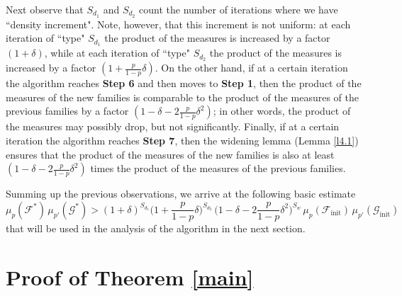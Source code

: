 \documentclass[10pt,a4paper]{amsart}
\theoremstyle{remark}
\newcommand{\Fcal}{\mathcal{F}}
\newcommand{\Gcal}{\mathcal{G}}
\begin{document}
Next observe that $S_{d_1}$ and $S_{d_2}$ count the number of iterations where we have ``density increment"\!.
Note, however, that this increment is not uniform: at each iteration of ``type" $S_{d_1}$
the product of the measures is increased by a factor $(1+\delta)$, while at each iteration of ``type" $S_{d_2}$
the product of the measures is increased by a factor $(1+\frac{p}{1-p}\delta)$. On the other hand, if at a certain
iteration the algorithm reaches \textbf{Step 6} and then moves to \textbf{Step 1}, then the product of the measures
of the new families is comparable to the product of the measures of the previous families by a factor
$(1-\delta-2\frac{p}{1-p}\delta^2)$; in other words, the product of the measures may possibly drop,
but not significantly. Finally,  if at a certain iteration the algorithm reaches \textbf{Step 7},
then the widening lemma (Lemma \ref{l4.1}) ensures that the product of the measures
of the new families is also at least $(1-\delta-2\frac{p}{1-p}\delta^2)$ times
the product of the measures of the previous families.

Summing up the previous observations, we arrive at the following basic estimate
\begin{equation} \label{e5.7}
\mu_p(\Fcal^*)\,\mu_{p'}(\Gcal^*) > (1+\delta)^{S_{d_1}} \Big(1+\frac{p}{1-p}\delta\Big)^{S_{d_2}}\,
\Big(1-\delta-2\frac{p}{1-p}\delta^2\Big)^{S_w}\, \mu_p(\Fcal_{\mathrm{init}})\, \mu_{p'}(\Gcal_{\mathrm{init}})
\end{equation}
that will be used in the analysis of the algorithm in the next section.


\section{Proof of Theorem \ref*{main}} \label{sec6}

\end{document}
